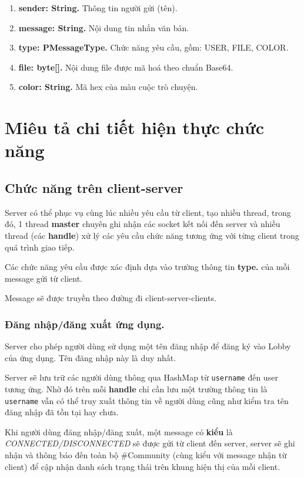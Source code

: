 \documentclass[a4paper]{article}
\begin{document}
\begin{enumerate}
	\item {\bf sender: String.} Thông tin người gửi (tên).
	\item {\bf message: String.} Nội dung tin nhắn văn bản.
	\item {\bf type: PMessageType.} Chức năng yêu cầu, gồm: USER, FILE, COLOR.
	\item {\bf file: byte[].} Nội dung file được mã hoá theo chuẩn Base64.
	\item {\bf color: String.} Mã hex của màu cuộc trò chuyện.
\end{enumerate}

\section{Miêu tả chi tiết hiện thực chức năng}

\subsection{Chức năng trên client-server}
Server có thể phục vụ cùng lúc nhiều yêu cầu từ client, tạo nhiều thread, trong đó, 1 thread {\bf master} chuyên ghi nhận các socket kết nối đến server và nhiều thread (các {\bf handle}) xử lý các yêu cầu chức năng tương ứng với từng client trong quá trình giao tiếp. 

Các chức năng yêu cầu được xác định dựa vào trường thông tin {\bf type.} của mỗi message gửi từ client.

Message sẽ được truyền theo đường đi client-server-clients.
\subsubsection{Đăng nhập/đăng xuất ứng dụng.}
Server cho phép người dùng sử dụng một tên đăng nhập để đăng ký vào Lobby của ứng dụng. Tên đăng nhập này là duy nhất. 

Server sẽ lưu trữ các người dùng thông qua HashMap từ {\tt username} đến {user} tương ứng. Nhờ đó trên mỗi {\bf handle} chỉ cần lưu một trường thông tin là {\tt username} vẫn có thể truy xuất thông tin về người dùng cũng như kiểm tra tên đăng nhập đã tồn tại hay chưa.

Khi người dùng đăng nhập/đăng xuất, một message có {\bf kiểu} là {\it CONNECTED/DISCONNECTED} sẽ được gửi từ client đến server, server sẽ ghi nhận và thông báo đến toàn bộ \#Community (cùng kiểu với message nhận từ client) để cập nhận danh sách trạng thái trên khung hiện thị của mỗi client.
\end{document}
